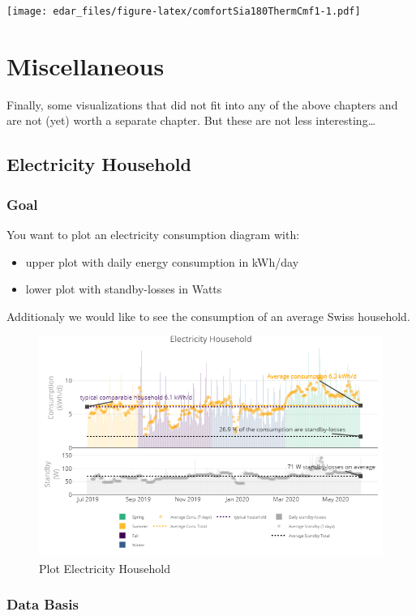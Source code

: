 \documentclass[
]{book}
\providecommand{\tightlist}{%
  \setlength{\itemsep}{0pt}\setlength{\parskip}{0pt}}
\begin{document}
\texttt{[image: edar\_files/figure-latex/comfortSia180ThermCmf1-1.pdf]}

\hypertarget{miscellaneous}{%
\chapter{Miscellaneous}\label{miscellaneous}}

Finally, some visualizations that did not fit into any of the above chapters and are not (yet) worth a separate chapter. But these are not less interesting\ldots{}

\hypertarget{electricity-household}{%
\section{Electricity Household}\label{electricity-household}}

\hypertarget{goal-14}{%
\subsection{Goal}\label{goal-14}}

You want to plot an electricity consumption diagram with:

\begin{itemize}
\tightlist
\item
  upper plot with daily energy consumption in kWh/day
\item
  lower plot with standby-losses in Watts
\end{itemize}

Additionaly we would like to see the consumption of an average Swiss household.

\begin{figure}
\includegraphics[width=0.7\linewidth]{images/eleHousehold} \caption{Plot Electricity Household}\label{fig:unnamed-chunk-24}
\end{figure}

\hypertarget{data-basis-14}{%
\subsection{Data Basis}\label{data-basis-14}}
\end{document}
